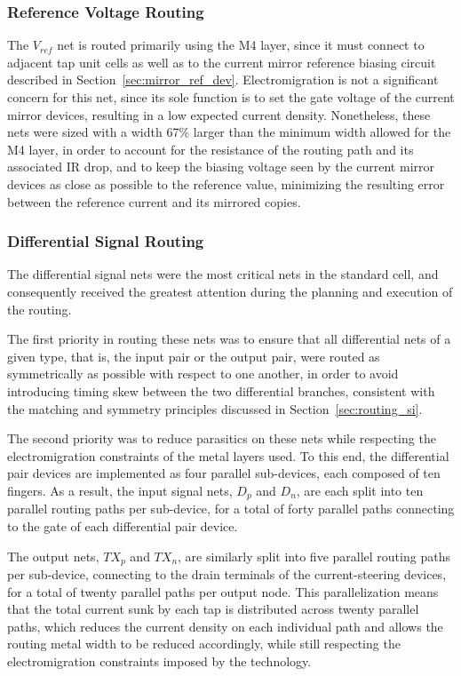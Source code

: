 \subsubsection{Reference Voltage Routing}

The $V_{ref}$ net is routed primarily using the \ac{M4} layer, since it must connect to adjacent tap unit cells as well as to the current mirror reference biasing circuit described in Section~\ref{sec:mirror_ref_dev}. Electromigration is not a significant concern for this net, since its sole function is to set the gate voltage of the current mirror devices, resulting in a low expected current density. Nonetheless, these nets were sized with a width 67\% larger than the minimum width allowed for the \ac{M4} layer, in order to account for the resistance of the routing path and its associated IR drop, and to keep the biasing voltage seen by the current mirror devices as close as possible to the reference value, minimizing the resulting error between the reference current and its mirrored copies.

\subsubsection{Differential Signal Routing}

The differential signal nets were the most critical nets in the standard cell, and consequently received the greatest attention during the planning and execution of the routing.

The first priority in routing these nets was to ensure that all differential nets of a given type, that is, the input pair or the output pair, were routed as symmetrically as possible with respect to one another, in order to avoid introducing timing skew between the two differential branches, consistent with the matching and symmetry principles discussed in Section~\ref{sec:routing_si}.

The second priority was to reduce parasitics on these nets while respecting the electromigration constraints of the metal layers used. To this end, the differential pair devices are implemented as four parallel sub-devices, each composed of ten fingers. As a result, the input signal nets, $D_p$ and $D_n$, are each split into ten parallel routing paths per sub-device, for a total of forty parallel paths connecting to the gate of each differential pair device.

The output nets, $TX_p$ and $TX_n$, are similarly split into five parallel routing paths per sub-device, connecting to the drain terminals of the current-steering devices, for a total of twenty parallel paths per output node. This parallelization means that the total current sunk by each tap is distributed across twenty parallel paths, which reduces the current density on each individual path and allows the routing metal width to be reduced accordingly, while still respecting the electromigration constraints imposed by the technology.

